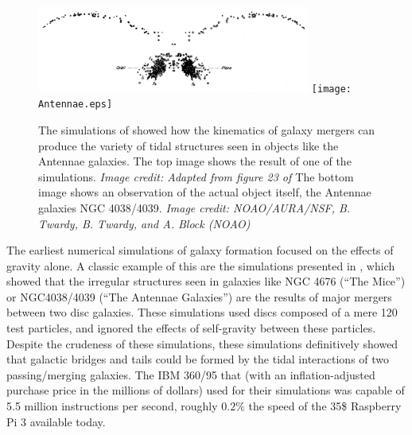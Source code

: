 \begin{figure}
    \includegraphics[width=0.8\textwidth]{Toomre.eps}
    \texttt{[image: Antennae.eps]}
    \caption[Early simulation of Antennae Galaxies]{The simulations of
    \citet{Toomre1972} showed how the kinematics of galaxy mergers can produce
    the variety of tidal structures seen in objects like the Antennae galaxies.
    The top image shows the result of one of the \citet{Toomre1972} simulations.
    \textit{Image credit: Adapted from figure 23 of \citet{Toomre1972}}
    The bottom image shows an observation of the actual object itself, the
    Antennae galaxies NGC 4038/4039. \textit{Image credit: NOAO/AURA/NSF, B.
    Twardy, B. Twardy, and A. Block (NOAO)}}
\end{figure}

The earliest numerical simulations of galaxy formation focused on the
effects of gravity alone.  A classic example of this are the simulations
presented in \citet{Toomre1972}, which showed that the irregular structures seen
in galaxies like NGC 4676 (``The Mice'') or NGC4038/4039 (``The Antennae
Galaxies'') are the results of major mergers between two disc galaxies.  These
simulations used discs composed of a mere 120 test particles, and ignored the
effects of self-gravity between these particles.  Despite the crudeness of these
simulations, these simulations definitively showed that galactic bridges and
tails could be formed by the tidal interactions of two passing/merging galaxies.
The IBM 360/95 that \citet{Toomre1972} (with an inflation-adjusted purchase
price in the millions of dollars) used for their simulations was capable of
5.5 million instructions per second, roughly $0.2\%$ the speed of the 35\$
Raspberry Pi 3 available today.

